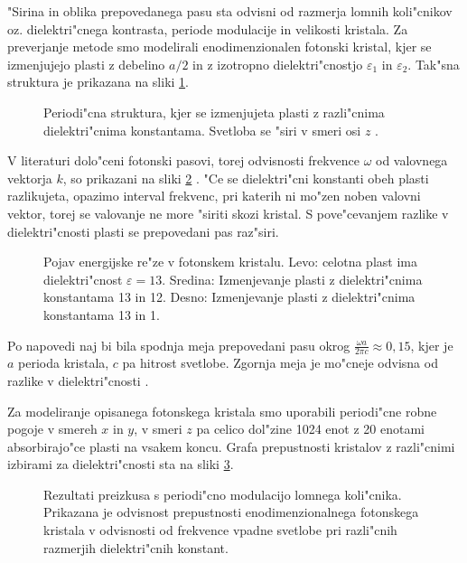 \documentclass[12pt,twoside,openright,final]{report}
\begin{document}
"Sirina in oblika prepovedanega pasu sta odvisni od razmerja lomnih koli"cnikov oz. dielektri"cnega kontrasta, periode modulacije in velikosti kristala. 
Za preverjanje metode smo modelirali enodimenzionalen fotonski kristal, kjer se izmenjujejo plasti z debelino $a/2$ in z izotropno dielektri"cnostjo $\varepsilon_1$ in $\varepsilon_2$. 
Tak"sna struktura je prikazana na sliki \ref{fig:periodic-structure}. 

\begin{figure}[h]
 \centering
 
 \caption{Periodi"cna struktura, kjer se izmenjujeta plasti z razli"cnima dielektri"cnima konstantama. 
 Svetloba se "siri v smeri osi $z$ \cite{joannopoulos}. }
 \label{fig:periodic-structure}
\end{figure}

V literaturi dolo"ceni fotonski pasovi, torej odvisnosti frekvence $\omega$ od valovnega vektorja $k$, so prikazani na sliki \ref{fig:joannopoulos-crystal} \cite{joannopoulos}. 
"Ce se dielektri"cni konstanti obeh plasti razlikujeta, opazimo interval frekvenc, pri katerih ni mo"zen noben valovni vektor, torej se valovanje ne more "siriti skozi kristal. 
S pove"cevanjem razlike v dielektri"cnosti plasti se prepovedani pas raz"siri. 

\begin{figure}[h]
\centering
  {\footnotesize }
 \caption{Pojav energijske re"ze v fotonskem kristalu. Levo: celotna plast ima dielektri"cnost $\varepsilon = 13$. Sredina: Izmenjevanje plasti z dielektri"cnima konstantama 13 in 12. Desno: Izmenjevanje plasti z dielektri"cnima konstantama 13 in 1. \cite{joannopoulos}}
 \label{fig:joannopoulos-crystal}
\end{figure}

Po napovedi naj bi bila spodnja meja prepovedani pasu okrog $\frac{\omega a}{2\pi c} \approx 0,\!15$, kjer je $a$ perioda kristala, $c$ pa hitrost svetlobe. 
Zgornja meja je mo"cneje odvisna od razlike v dielektri"cnosti \cite{joannopoulos}. 

Za modeliranje opisanega fotonskega kristala smo uporabili periodi"cne robne pogoje v smereh $x$ in $y$, v smeri $z$ pa celico dol"zine 1024 enot z 20 enotami absorbirajo"ce plasti na vsakem koncu. 
Grafa prepustnosti kristalov z razli"cnimi izbirami za dielektri"cnosti sta na sliki \ref{fig:test-periodic}. 

\begin{figure}[!htbp]
 
 \caption{Rezultati preizkusa s periodi"cno modulacijo lomnega koli"cnika. Prikazana je odvisnost prepustnosti enodimenzionalnega fotonskega kristala v odvisnosti od frekvence vpadne svetlobe pri razli"cnih razmerjih dielektri"cnih konstant. }
 \label{fig:test-periodic}
\end{figure}
\end{document}
